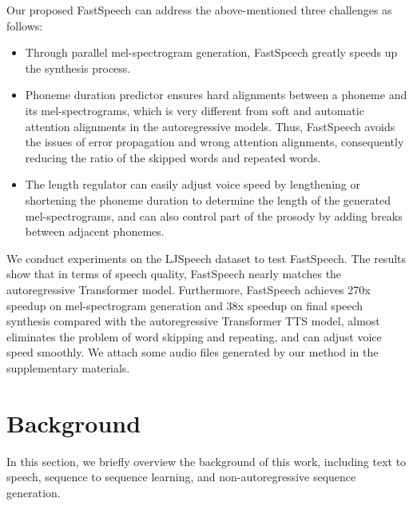 \documentclass{article}
\begin{document}
Our proposed FastSpeech can address the above-mentioned three challenges as follows:
\begin{itemize}
\item Through parallel mel-spectrogram generation, FastSpeech greatly speeds up the synthesis process. 
\item Phoneme duration predictor ensures hard alignments between a phoneme and its mel-spectrograms, which is very different from soft and automatic attention alignments in the autoregressive models. Thus, FastSpeech avoids the issues of error propagation and wrong attention alignments, consequently reducing the ratio of the skipped words and repeated words. 
\item The length regulator can easily adjust voice speed by lengthening or shortening the phoneme duration to determine the length of the generated mel-spectrograms, and can also control part of the prosody by adding breaks between adjacent phonemes. 
\end{itemize}

We conduct experiments on the LJSpeech dataset to test FastSpeech. The results show that in terms of speech quality, FastSpeech nearly matches the autoregressive Transformer model. Furthermore, FastSpeech achieves 270x speedup on mel-spectrogram generation and 38x speedup on final speech synthesis compared with the autoregressive Transformer TTS model, almost eliminates the problem of word skipping and repeating, and can adjust voice speed smoothly. We attach some audio files generated by our method in the supplementary materials.



\section{Background}
In this section, we briefly overview the background of this work, including text to speech, sequence to sequence learning, and non-autoregressive sequence generation. 
\end{document}
